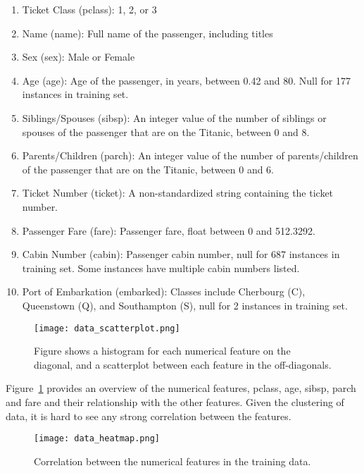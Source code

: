 \documentclass[12pt, letterpaper]{article}
\begin{document}
\begin{enumerate}
	\item Ticket Class (pclass): 1, 2, or 3
	\item Name (name): Full name of the passenger, including titles
	\item Sex (sex): Male or Female
	\item Age (age): Age of the passenger, in years, between 0.42 and 80. Null for 177 instances in training set.
	\item Siblings/Spouses (sibsp): An integer value of the number of siblings or spouses of the passenger that are on the Titanic, between 0 and 8.
	\item Parents/Children (parch): An integer value of the number of parents/children of the passenger that are on the Titanic, between 0 and 6.
	\item Ticket Number (ticket): A non-standardized string containing the ticket number.
	\item Passenger Fare (fare): Passenger fare, float between 0 and 512.3292.
	\item Cabin Number (cabin): Passenger cabin number, null for 687 instances in training set. Some instances have multiple cabin numbers listed.
	\item Port of Embarkation (embarked): Classes include Cherbourg (C), Queenstown (Q), and Southampton (S), null for 2 instances in training set.
\end{enumerate}

\begin{figure}[H]
    \centering
    \texttt{[image: data\_scatterplot.png]}
    \caption{Figure shows a histogram for each numerical feature on the diagonal, and a scatterplot between each feature in the off-diagonals.}
    \label{fig:data_scatter}
\end{figure}


Figure~\ref{fig:data_scatter} provides an overview of the numerical features, pclass, age, sibsp, parch and fare and their relationship with the other features. Given the clustering of data, it is hard to see any strong correlation between the features.

\begin{figure}[H]
    \centering
    \texttt{[image: data\_heatmap.png]}
    \caption{Correlation between the numerical features in the training data. }
    \label{fig:data_heatmap}
\end{figure}
\end{document}
